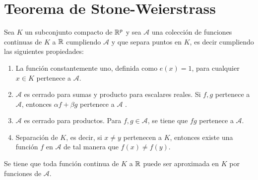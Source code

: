 %

\section{Teorema de Stone-Weierstrass }\label{ch:TeoremaStoneWeiertrass}

\begin{teorema} 

    Sea $K$ un subconjunto compacto de $\mathbb{R}^p$ y sea $\mathcal{A}$ una colección de 
    funciones continuas de $K$ a $\mathbb{R}$ cumpliendo $\mathcal{A}$ y 
    que separa puntos en $K$, es decir cumpliendo las siguientes propiedades: 

    \begin{enumerate}
        \item La función constantemente uno, definida como $e(x)=1$, para cualquier $x\in K$ pertenece a $\mathcal{A}$.
        \item $\mathcal{A}$ es cerrado para sumas y producto para escalares reales. Si $f,g$ pertenece a  $\mathcal{A}$, entonces $\alpha f + \beta g$ pertenece a $\mathcal{A}$ . 
        \item $\mathcal{A}$ es cerrado para productos. Para $f,g \in \mathcal A$, se tiene que $fg$ pertenece a $\mathcal{A}$. 
        \item Separación de $K$, es decir, si $x \neq y$ pertenecen a $K$, entonces existe una función $f$ en $\mathcal{A}$  de tal manera que $f(x) \neq f(y)$. 
    \end{enumerate}
    
    Se tiene que toda función continua de $K$ a $\mathbb{R}$ puede ser aproximada en $K$ por funciones de $\mathcal A$. 

\end{teorema}  

